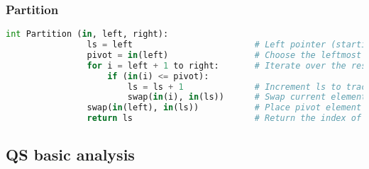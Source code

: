     \subsubsection{Partition}
    \begin{definition}
        \begin{lstlisting}[language=Python, caption={Partition Function Pseudocode with Comments}]
            int Partition (in, left, right):
                ls = left                        # Left pointer (starting index)
                pivot = in(left)                 # Choose the leftmost element as the pivot
                for i = left + 1 to right:       # Iterate over the rest of the elements
                    if (in(i) <= pivot):         
                        ls = ls + 1              # Increment ls to track smaller elements
                        swap(in(i), in(ls))      # Swap current element with the element at ls
                swap(in(left), in(ls))           # Place pivot element in correct position
                return ls                        # Return the index of the pivot
        \end{lstlisting}


    \end{definition}

    \begin{intuition}
    \end{intuition}

\subsection{QS basic analysis}
